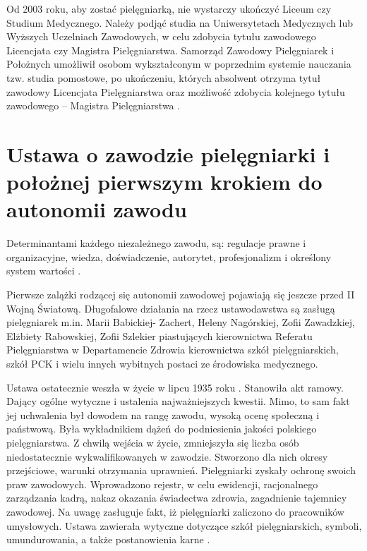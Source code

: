 \documentclass[a4paper,12pt,twoside,openany]{report}
\begin{document}
Od 2003 roku, aby zostać pielęgniarką, nie wystarczy ukończyć Liceum czy Studium Medycznego. Należy podjąć studia na Uniwersytetach Medycznych lub Wyższych Uczelniach Zawodowych, w celu zdobycia tytułu zawodowego Licencjata czy Magistra Pielęgniarstwa. Samorząd Zawodowy Pielęgniarek i Położnych umożliwił osobom wykształconym w poprzednim systemie nauczania tzw. studia pomostowe, po ukończeniu, których absolwent otrzyma tytuł zawodowy Licencjata Pielęgniarstwa oraz możliwość zdobycia kolejnego tytułu zawodowego – Magistra Pielęgniarstwa \cite{model}.

\section{Ustawa o zawodzie pielęgniarki i położnej pierwszym krokiem do autonomii zawodu}
Determinantami każdego niezależnego zawodu, są: regulacje prawne i organizacyjne, wiedza, doświadczenie, autorytet, profesjonalizm i określony system wartości  \cite{deter}.

Pierwsze zalążki rodzącej się autonomii zawodowej pojawiają się jeszcze przed II Wojną Światową. Długofalowe działania na rzecz ustawodawstwa są zasługą pielęgniarek m.in.  Marii Babickiej- Zachert, Heleny Nagórskiej, Zofii Zawadzkiej, Elżbiety Rabowskiej, Zofii Szlekier piastujących kierownictwa Referatu Pielęgniarstwa w Departamencie Zdrowia kierownictwa szkół pielęgniarskich, szkół PCK i wielu innych wybitnych postaci ze środowiska medycznego.

Ustawa ostatecznie weszła w życie w lipcu 1935 roku \cite{usta}. Stanowiła akt ramowy. Dający ogólne wytyczne i ustalenia najważniejszych kwestii. Mimo, to sam fakt jej uchwalenia był dowodem na rangę zawodu, wysoką ocenę społeczną i państwową. Była wykładnikiem dążeń do podniesienia jakości polskiego pielęgniarstwa. Z chwilą wejścia w życie, zmniejszyła się liczba osób niedostatecznie wykwalifikowanych w zawodzie. Stworzono dla nich okresy przejściowe, warunki otrzymania uprawnień. Pielęgniarki zyskały ochronę swoich praw zawodowych. Wprowadzono rejestr, w celu ewidencji, racjonalnego zarządzania kadrą, nakaz okazania świadectwa zdrowia, zagadnienie tajemnicy zawodowej. Na uwagę zasługuje fakt, iż pielęgniarki zaliczono do pracowników umysłowych. Ustawa zawierała wytyczne dotyczące szkół pielęgniarskich, symboli, umundurowania, a także postanowienia karne \cite{1935}.
\end{document}
